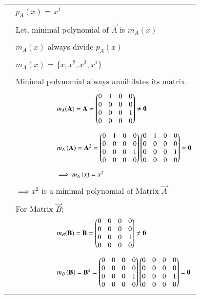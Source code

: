 \documentclass[journal,12pt]{IEEEtran}
\begin{document}
\begin{longtable}{|p{5cm}|p{13cm}|}
    & $p_A(x)$ = $x^4$ \\
    &\\
    & Let, minimal polynomial of $\vec{A}$ is $m_A(x)$\\
    &\\
    & $m_A(x)$ always divide $p_A(x)$ \\
    &\\
    & $m_A(x)$ = $\{x,x^2,x^3,x^4\}$\\
    &\\
    &  Minimal polynomial always annihilates its matrix.\\
    &\\
    \hline
    & $\qquad\qquad\qquad m_A(\mathbf{A}) = \mathbf{A} =\begin{pmatrix}0&1&0&0\\0&0&0&0\\0&0&0&1\\0&0&0&0\end{pmatrix} \neq\mathbf{0}$\\
    &\\
    &$\qquad\qquad\qquad m_A\left(\mathbf{A}\right)=\mathbf{A}^2 =\begin{pmatrix}0&1&0&0\\0&0&0&0\\0&0&0&1\\0&0&0&0\end{pmatrix}\begin{pmatrix}0&1&0&0\\0&0&0&0\\0&0&0&1\\0&0&0&0\end{pmatrix}=\mathbf{0}$\\
    &\\
    & $ \qquad\qquad\qquad\implies m_A\left(x\right) = x^2$\\
    &\\
    & $\implies x^2$ is a minimal polynomial of Matrix $\vec{A}$\\
    &\\
    & For Matrix $\vec{B}$;\\
    &$\qquad\qquad\qquad m_B(\mathbf{B}) = \mathbf{B} =\begin{pmatrix}0&0&0&0\\0&0&0&0\\0&0&0&1\\0&0&0&0\end{pmatrix} \neq\mathbf{0}$\\
    &\\
    &$\qquad\qquad\qquad m_B\left(\mathbf{B}\right)=\mathbf{B}^2 =\begin{pmatrix}0&0&0&0\\0&0&0&0\\0&0&0&1\\0&0&0&0\end{pmatrix}\begin{pmatrix}0&0&0&0\\0&0&0&0\\0&0&0&1\\0&0&0&0\end{pmatrix}=\mathbf{0}$\\
    &\\

\end{longtable}
\end{document}

